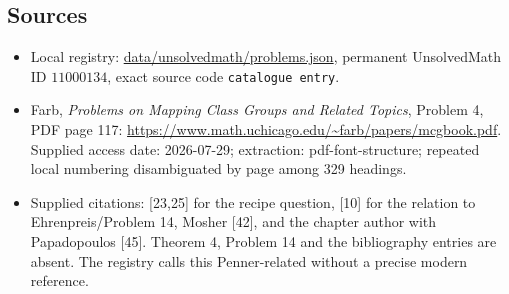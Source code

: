 \documentclass[11pt]{article}
\begin{document}
\subsection{Sources}
\begin{itemize}
\item Local registry: \url{data/unsolvedmath/problems.json}, permanent UnsolvedMath ID $11000134$, exact source code \texttt{catalogue entry}.
\item Farb, \emph{Problems on Mapping Class Groups and Related Topics}, Problem 4, PDF page 117: \url{https://www.math.uchicago.edu/~farb/papers/mcgbook.pdf}. Supplied access date: 2026-07-29; extraction: pdf-font-structure; repeated local numbering disambiguated by page among 329 headings.
\item Supplied citations: [23,25] for the recipe question, [10] for the relation to Ehrenpreis/Problem 14, Mosher [42], and the chapter author with Papadopoulos [45]. Theorem 4, Problem 14 and the bibliography entries are absent. The registry calls this Penner-related without a precise modern reference.
\end{itemize}
\end{document}
